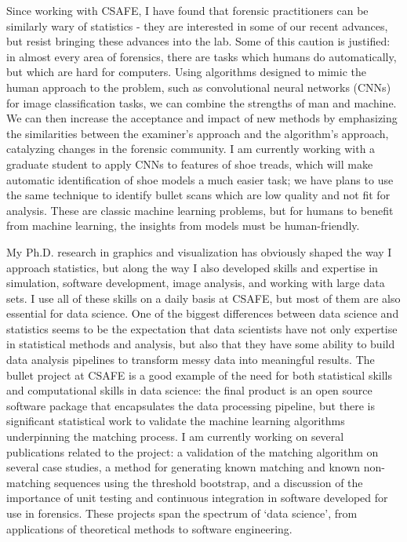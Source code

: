 \documentclass[12pt, letterpaper, sans]{moderncv}
\begin{document}
Since working with CSAFE, I have found that forensic practitioners can be similarly wary of statistics - they are interested in some of our recent advances, but resist bringing these advances into the lab. Some of this caution is justified: in almost every area of forensics, there are tasks which humans do automatically, but which are hard for computers. Using algorithms designed to mimic the human approach to the problem, such as convolutional neural networks (CNNs) for image classification tasks, we can combine the strengths of man and machine. We can then increase the acceptance and impact of new methods by emphasizing the similarities between the examiner's approach and the algorithm's approach, catalyzing changes in the forensic community. I am currently working with a graduate student to apply CNNs to features of shoe treads, which will make automatic identification of shoe models a much easier task; we have plans to use the same technique to identify bullet scans which are low quality and not fit for analysis. These are classic machine learning problems, but for humans to benefit from machine learning, the insights from models must be human-friendly. 

My Ph.D. research in graphics and visualization has obviously shaped the way I approach statistics, but along the way I also developed skills and expertise in simulation, software development, image analysis, and working with large data sets. I use all of these skills on a daily basis at CSAFE, but most of them are also essential for data science. One of the biggest differences between data science and statistics seems to be the expectation that data scientists have not only expertise in statistical methods and analysis, but also that they have some ability to build data analysis pipelines to transform messy data into meaningful results. The bullet project at CSAFE is a good example of the need for both statistical skills and computational skills in data science: the final product is an open source software package that encapsulates the data processing pipeline, but there is significant statistical work to validate the machine learning algorithms underpinning the matching process. I am currently working on several publications related to the project: a validation of the matching algorithm on several case studies, a method for generating known matching and known non-matching sequences using the threshold bootstrap, and a discussion of the importance of unit testing and continuous integration in software developed for use in forensics. These projects span the spectrum of `data science', from applications of theoretical methods to software engineering. 
\end{document}
